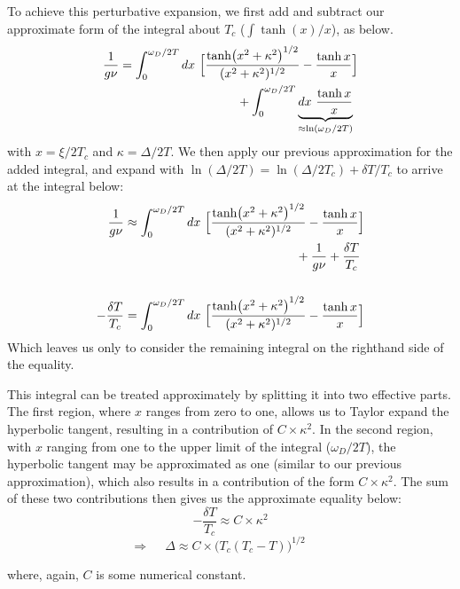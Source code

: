 \documentclass[10pt,a4paper]{article}
\begin{document}
\begin{multicols}{2}
To achieve this perturbative expansion, we first add and subtract our approximate form of the integral about $T_c$ ($\int \tanh(x)/x$), as below.
\begin{align*}
\frac{1}{g\nu}& = \int_0^{\omega_D/2T}dx\ \Big[\frac{\tanh(x^2+\kappa^2)^{1/2}}{(x^2+\kappa^2)^{1/2}} -\frac{\tanh x}{x} \Big]\\&\hspace{3.35cm} +\int_0^{\omega_D/2T}\underbrace{dx\ \frac{\tanh x}{x}}_{\approx \ln(\omega_D/2T) }
\end{align*}
with $x=\xi/2T_c$ and $\kappa = \Delta/2T$. We then apply our previous approximation for the added integral, and expand with $\ln(\Delta/2T) = \ln(\Delta/2T_c) + \delta T/ T_c$ to arrive at the integral below:
\begin{align*}
\frac{1}{g\nu}& \approx \int_0^{\omega_D/2T}dx\ \Big[\frac{\tanh(x^2+\kappa^2)^{1/2}}{(x^2+\kappa^2)^{1/2}} -\frac{\tanh x}{x} \Big]\\&\hspace{4.85cm} +\frac{1}{g\nu} + \frac{\delta T}{T_c}\\
\\
-\frac{\delta T}{T_c}&=\int_0^{\omega_D/2T}dx\ \Big[\frac{\tanh(x^2+\kappa^2)^{1/2}}{(x^2+\kappa^2)^{1/2}} -\frac{\tanh x}{x} \Big]
\end{align*}
Which leaves us only to consider the remaining integral on the righthand side of the equality.

This integral can be treated approximately by splitting it into two effective parts. The first region, where $x$ ranges from zero to one, allows us to Taylor expand the hyperbolic tangent, resulting in a contribution of $C \times \kappa^2$. In the second region, with $x$ ranging from one to the upper limit of the integral ($\omega_D/2T$), the hyperbolic tangent may be approximated as one (similar to our previous approximation), which also results in a contribution of the form $C \times \kappa^2$. The sum of these two contributions then gives us the approximate equality below:
$$
-\frac{\delta T}{T_c}\approx C\times \kappa^2
$$
$$
\Rightarrow\quad \  \Delta \approx C\times \big(T_c(T_c-T)\big)^{1/2}\quad\quad
$$

where, again, $C$ is some numerical constant.

\end{multicols}
\end{document}
